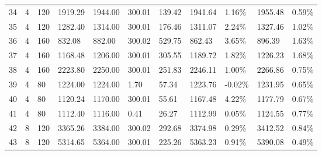 \documentclass[../main]{subfiles}
\begin{document}
\begin{longtable}{l|ll|lll|lllll}
   34                  & 4                               & 120                    & 1919.29             & 1944.00  & 300.01        & \cellcolor{green!25}139.42 & \cellcolor{green!25}1941.64 & 1.16\%  & 1955.48 & 0.59\% \\
   35                  & 4                               & 120                    & 1282.40             & 1314.00  & 300.01        & \cellcolor{green!25}176.46 & \cellcolor{green!25}1311.07 & 2.24\%  & 1327.46 & 1.02\% \\
   36                  & 4                               & 160                    & 832.08              & 882.00   & 300.02        & 529.75                     & \cellcolor{green!25}862.43  & 3.65\%  & 896.39  & 1.63\% \\
   37                  & 4                               & 160                    & 1168.48             & 1206.00  & 300.01        & 305.55                     & \cellcolor{green!25}1189.72 & 1.82\%  & 1226.23 & 1.68\% \\
   38                  & 4                               & 160                    & 2223.80             & 2250.00  & 300.01        & \cellcolor{green!25}251.83 & \cellcolor{green!25}2246.11 & 1.00\%  & 2266.86 & 0.75\% \\
   39                  & 4                               & 80                     & 1224.00             & 1224.00  & 1.70          & 57.34                      & 1223.76                     & -0.02\% & 1231.95 & 0.65\% \\
   40                  & 4                               & 80                     & 1120.24             & 1170.00  & 300.01        & \cellcolor{green!25}55.61  & \cellcolor{green!25}1167.48 & 4.22\%  & 1177.79 & 0.67\% \\
   41                  & 4                               & 80                     & 1112.40             & 1116.00  & 0.41          & 26.27                      & \cellcolor{green!25}1112.99 & 0.05\%  & 1124.55 & 0.77\% \\
   42                  & 8                               & 120                    & 3365.26             & 3384.00  & 300.02        & \cellcolor{green!25}292.68 & \cellcolor{green!25}3374.98 & 0.29\%  & 3412.52 & 0.84\% \\
   43                  & 8                               & 120                    & 5314.65             & 5364.00  & 300.01        & \cellcolor{green!25}225.26 & \cellcolor{green!25}5363.23 & 0.91\%  & 5390.08 & 0.49\% \\

\end{longtable}
\end{document}
